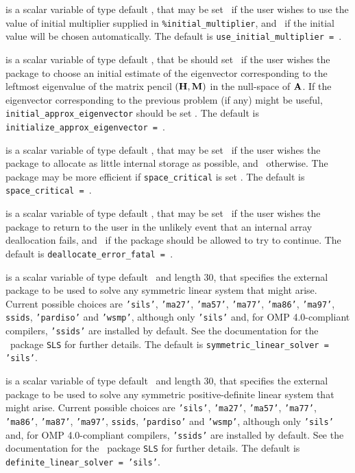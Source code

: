 \documentclass{galahad}
\begin{document}
\begin{description}
 is a scalar variable of type default \logical,
that may be set \true\ if the user wishes to use the value of initial
multiplier supplied in {\tt \%initial\_multiplier},
and \false\ if the initial value will be chosen automatically.
The default is {\tt use\_initial\_multiplier = \false}.

 is a scalar variable of type default
\logical, that be should set \true\ if the user wishes the package to choose an
initial estimate of the eigenvector corresponding to the leftmost eigenvalue of
the matrix pencil $({\mathbf{H}},{\mathbf{M}})$ in the null-space of ${\mathbf{A}}$.
If the eigenvector corresponding to the previous
problem (if any) might be useful, {\tt initial\_approx\_eigenvector}
should be set \false.
The default is {\tt initialize\_approx\_eigenvector = \true}.

 is a scalar variable of type default \logical, that
may be set \true\ if the user wishes the package to allocate as little
internal storage as possible, and \false\ otherwise. The package may
be more efficient if {\tt space\_critical} is set \false.
The default is {\tt space\_critical = \false}.

 is a scalar variable of type default \logical,
that may be set \true\ if the user wishes the package to return to the user
in the unlikely event that an internal array deallocation fails,
and \false\ if the package should be allowed to try to continue.
The default is {\tt deallocate\_error\_fatal = \false}.

 is a scalar variable of type default \character\
and length 30, that specifies the external package to be used to
solve any symmetric linear system that might arise. Current possible
choices are {\tt 'sils'}, {\tt 'ma27'}, {\tt 'ma57'}, {\tt 'ma77'},
{\tt 'ma86'}, {\tt 'ma97'}, {\tt ssids}, {\tt 'pardiso'}
and {\tt 'wsmp'},
although only {\tt 'sils'} and, for OMP 4.0-compliant compilers,
{\tt 'ssids'} are installed by default.
See the documentation for the \galahad\ package {\tt SLS} for further details.
The default is {\tt symmetric\_linear\_solver = 'sils'}.

 is a scalar variable of type default \character\
and length 30, that specifies the external package to be used to
solve any symmetric positive-definite linear system that might arise.
Current possible
choices are {\tt 'sils'}, {\tt 'ma27'}, {\tt 'ma57'}, {\tt 'ma77'},
{\tt 'ma86'}, {\tt 'ma87'}, {\tt 'ma97'}, {\tt ssids}, {\tt 'pardiso'}
and {\tt 'wsmp'},
although only {\tt 'sils'} and, for OMP 4.0-compliant compilers,
{\tt 'ssids'} are installed by default.
See the documentation for the \galahad\ package {\tt SLS} for further details.
The default is {\tt definite\_linear\_solver = 'sils'}.


\end{description}
\end{document}
